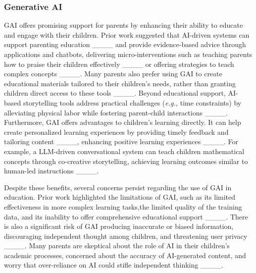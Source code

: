 \subsubsection{Generative AI}
GAI offers promising support for parents by enhancing their ability to educate and engage with their children. Prior work suggested that AI-driven systems can support parenting education ____ and provide evidence-based advice through applications and chatbots, delivering micro-interventions such as teaching parents how to praise their children effectively ____ or offering strategies to teach complex concepts ____. Many parents also prefer using GAI to create educational materials tailored to their children's needs, rather than granting children direct access to these tools ____. Beyond educational support, AI-based storytelling tools address practical challenges (\textit{e.g.,} time constraints) by alleviating physical labor while fostering parent-child interactions ____. Furthermore, GAI offers advantages to children's learning directly. It can help create personalized learning experiences by providing timely feedback and tailoring content ____, enhancing positive learning experiences ____. For example, a LLM-driven conversational system can teach children mathematical concepts through co-creative storytelling, achieving learning outcomes similar to human-led instructions ____.

Despite these benefits, several concerns persist regarding the use of GAI in education. Prior work highlighted the limitations of GAI, such as its limited effectiveness in more complex learning tasks,the limited quality of the training data, and its inability to offer comprehensive educational support ____. There is also a significant risk of GAI producing inaccurate or biased information, discouraging independent thought among children, and threatening user privacy ____. Many parents are skeptical about the role of AI in their children's academic processes, concerned about the accuracy of AI-generated content, and worry that over-reliance on AI could stifle independent thinking ____.

